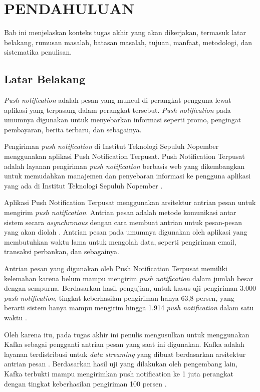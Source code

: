 \vspace{0ex}
\chapter {PENDAHULUAN}
\par Bab ini menjelaskan konteks tugas akhir yang akan dikerjakan, termasuk latar belakang, rumusan masalah, batasan masalah, tujuan, manfaat, metodologi, dan sistematika penulisan.

\section{Latar Belakang}
\par \textit{Push notification} adalah pesan yang muncul di perangkat pengguna lewat aplikasi yang terpasang dalam perangkat tersebut. \textit{Push notification} pada umumnya digunakan untuk menyebarkan informasi seperti promo, pengingat pembayaran, berita terbaru, dan sebagainya.
\par Pengiriman \textit{push notification} di Institut Teknologi Sepuluh Nopember menggunakan aplikasi Push Notification Terpusat. Push Notification Terpusat adalah layanan pengiriman \textit{push notification} berbasis web yang dikembangkan untuk memudahkan manajemen dan penyebaran informasi ke pengguna aplikasi yang ada di Institut Teknologi Sepuluh Nopember \cite{application-thesis}.
\par Aplikasi Push Notification Terpusat menggunakan arsitektur antrian pesan untuk mengirim \textit{push notification}. Antrian pesan adalah metode komunikasi antar sistem secara \textit{asynchronous} dengan cara membuat antrian untuk pesan-pesan yang akan diolah \cite{message-queue-online}. Antrian pesan pada umumnya digunakan oleh aplikasi yang membutuhkan waktu lama untuk mengolah data, seperti pengiriman email, transaksi perbankan, dan sebagainya.
\par Antrian pesan yang digunakan oleh Push Notification Terpusat memiliki kelemahan karena belum mampu mengirim \textit{push notification} dalam jumlah besar dengan sempurna. Berdasarkan hasil pengujian, untuk kasus uji pengiriman 3.000 \textit{push notification}, tingkat keberhasilan pengiriman hanya 63,8 persen, yang berarti sistem hanya mampu mengirim hingga 1.914 \textit{push notification} dalam satu waktu \cite{application-thesis}.
\par Oleh karena itu, pada tugas akhir ini penulis mengusulkan untuk menggunakan Kafka sebagai pengganti antrian pesan yang saat ini digunakan. Kafka adalah layanan terdistribusi untuk \textit{data streaming} yang dibuat berdasarkan arsitektur antrian pesan \cite{kafka-online}. Berdasarkan hasil uji yang dilakukan oleh pengembang lain, Kafka terbukti mampu mengirimkan push notification ke 1 juta perangkat dengan tingkat keberhasilan pengiriman 100 persen \cite{prototype-article}.

